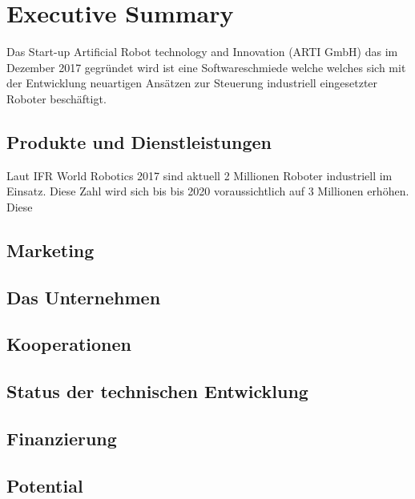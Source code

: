 \chapter{Executive Summary}

Das Start-up Artificial Robot technology and Innovation (ARTI GmbH) das im Dezember 2017 gegründet wird ist eine Softwareschmiede welche welches sich mit der Entwicklung neuartigen Ansätzen zur Steuerung industriell eingesetzter Roboter beschäftigt.

\section{Produkte und Dienstleistungen}

Laut IFR World Robotics 2017 sind aktuell 2 Millionen Roboter industriell im Einsatz. Diese Zahl wird sich bis bis 2020 voraussichtlich auf 3 Millionen erhöhen. Diese 

\section{Marketing}

\section{Das Unternehmen}

\section{Kooperationen}

\section{Status der technischen Entwicklung}

\section{Finanzierung}

\section{Potential}

\blindtext
\newpage
\blindtext
